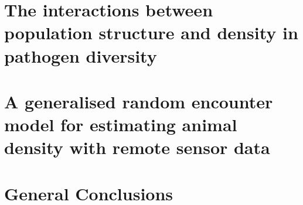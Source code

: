 \documentclass[11pt,phd,a4paper,twoside]{PrettyStanley}
\begin{document}
\chapter{The interactions between population structure and density in pathogen diversity}
\label{chapterlabel4}



\chapter[gREM for estimating animal density]{A generalised random encounter model for estimating animal density with remote sensor data}
\label{chapterlabel5}


\chapter{General Conclusions}
\label{conclusions}




 


\printbibliography 


\end{document}
